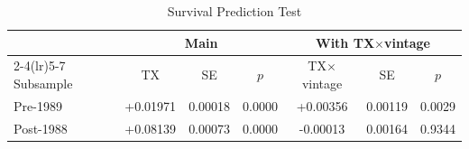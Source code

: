 \begin{table}[htbp]\centering
\caption{Survival Prediction Test}
\label{tbl:survival_prediction}
\begin{tabular}{lcccccc}\toprule
 & \multicolumn{3}{c}{Main} & \multicolumn{3}{c}{With TX$\times$vintage} \\
\cmidrule(lr){2-4}\cmidrule(lr){5-7}
Subsample & TX & SE & $p$ & TX$\times$vintage & SE & $p$ \\
\midrule
Pre-1989  & +0.01971 & 0.00018 & 0.0000 & +0.00356 & 0.00119 & 0.0029 \\
Post-1988 & +0.08139 & 0.00073 & 0.0000 & -0.00013 & 0.00164 & 0.9344 \\
\bottomrule\end{tabular}
\end{table}

